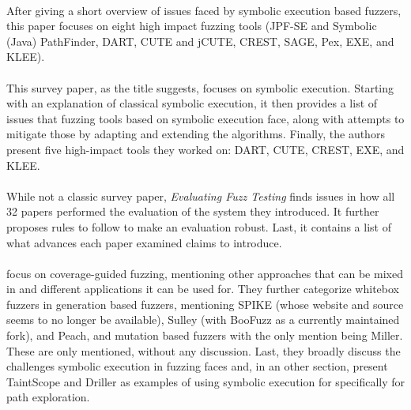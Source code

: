 \documentclass{article}
\begin{document}
\begin{multicols}{2}
    \paragraph{}
    After giving a short overview of issues faced by symbolic execution based fuzzers, this paper focuses on eight high impact fuzzing tools (JPF-SE and Symbolic (Java) PathFinder\cite{JPFSE, JavaPathFinder}, DART\cite{DART}, CUTE\cite{CUTE} and jCUTE\cite{ExplicitPathModelChecking}, CREST\cite{CREST}, SAGE\cite{SAGE}, Pex\cite{Pex}, EXE\cite{EXE}, and KLEE\cite{KLEE}).

    \paragraph{}
    This survey paper, as the title suggests, focuses on symbolic execution. Starting with an explanation of classical symbolic execution, it then provides a list of issues that fuzzing tools based on symbolic execution face, along with attempts to mitigate those by adapting and extending the algorithms. Finally, the authors present five high-impact tools they worked on: DART\cite{DART}, CUTE\cite{CUTE}, CREST\cite{CREST}, EXE\cite{EXE}, and KLEE\cite{KLEE}.

    \paragraph{}
    While not a classic survey paper, \textit{Evaluating Fuzz Testing} finds issues in how all 32 papers performed the evaluation of the system they introduced. It further proposes rules to follow to make an evaluation robust. Last, it contains a list of what advances each paper examined claims to introduce.

    \paragraph{}
    \citeauthor{FuzzingASurvey} focus on coverage-guided fuzzing, mentioning other approaches that can be mixed in and different applications it can be used for. They further categorize whitebox fuzzers in generation based fuzzers, mentioning SPIKE\cite{Spike} (whose website and source seems to no longer be available), Sulley\cite{Sulley} (with BooFuzz\cite{BooFuzz} as a currently maintained fork), and Peach\cite{Peach}, and mutation based fuzzers with the only mention being Miller\cite{Miller}. These are only mentioned, without any discussion. Last, they broadly discuss the challenges symbolic execution in fuzzing faces and, in an other section, present TaintScope\cite{TaintScope} and Driller\cite{Driller} as examples of using symbolic execution for specifically for path exploration.


\end{multicols}
\end{document}
